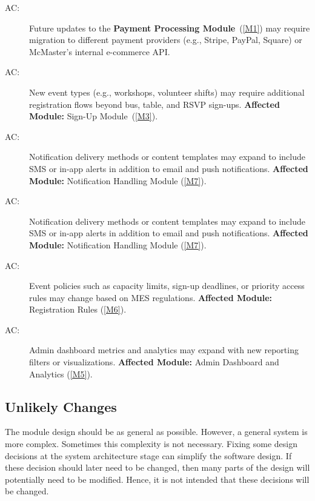 \documentclass[12pt, titlepage]{article}
\newcounter{acnum}
\newcommand{\actheacnum}{AC\theacnum}
\begin{document}
\begin{description}
  
\item[ \actheacnum \label{acPaymentGateway}:] 
Future updates to the \textbf{Payment Processing Module}~(\ref{M1}) may require migration 
to different payment providers (e.g., Stripe, PayPal, Square) or McMaster’s internal 
e-commerce API.

\item[ \actheacnum \label{acSignupTypes}:] 
New event types (e.g., workshops, volunteer shifts) may require additional registration 
flows beyond bus, table, and RSVP sign-ups. 
\textbf{Affected Module:} Sign-Up Module~(\ref{M3}).

\item[ \actheacnum \label{acNotifications}:] 
Notification delivery methods or content templates may expand to include SMS or 
in-app alerts in addition to email and push notifications. 
\textbf{Affected Module:} Notification Handling Module (\ref{M7}).

\item[ \actheacnum \label{acNotifications}:] 
Notification delivery methods or content templates may expand to include SMS or 
in-app alerts in addition to email and push notifications. 
\textbf{Affected Module:} Notification Handling Module (\ref{M7}).

\item[ \actheacnum \label{acPolicyRules}:] 
Event policies such as capacity limits, sign-up deadlines, or priority access 
rules may change based on MES regulations. 
\textbf{Affected Module:} Registration Rules (\ref{M6}).

\item[ \actheacnum \label{acAnalytics}:] 
Admin dashboard metrics and analytics may expand with new reporting filters 
or visualizations. 
\textbf{Affected Module:} Admin Dashboard and Analytics (\ref{M5}).

\end{description}

\subsection{Unlikely Changes} \label{SecUchange}

The module design should be as general as possible. However, a general system is
more complex. Sometimes this complexity is not necessary. Fixing some design
decisions at the system architecture stage can simplify the software design. If
these decision should later need to be changed, then many parts of the design
will potentially need to be modified. Hence, it is not intended that these
decisions will be changed.
\end{document}
